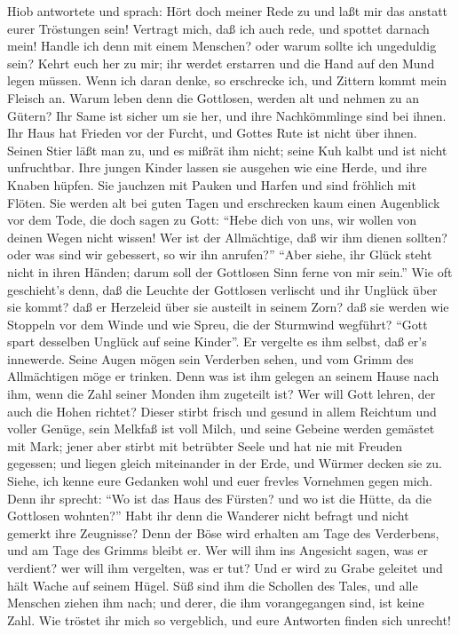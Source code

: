  Hiob antwortete und sprach:  Hört doch meiner
Rede zu und laßt mir das anstatt eurer Tröstungen sein! 
Vertragt mich, daß ich auch rede, und spottet darnach mein! 
Handle ich denn mit einem Menschen? oder warum sollte ich ungeduldig
sein?  Kehrt euch her zu mir; ihr werdet erstarren und die
Hand auf den Mund legen müssen.  Wenn ich daran denke, so
erschrecke ich, und Zittern kommt mein Fleisch an.  Warum
leben denn die Gottlosen, werden alt und nehmen zu an Gütern?
 Ihr Same ist sicher um sie her, und ihre Nachkömmlinge sind
bei ihnen.  Ihr Haus hat Frieden vor der Furcht, und Gottes
Rute ist nicht über ihnen.  Seinen Stier läßt man zu, und
es mißrät ihm nicht; seine Kuh kalbt und ist nicht unfruchtbar.
 Ihre jungen Kinder lassen sie ausgehen wie eine Herde, und
ihre Knaben hüpfen.  Sie jauchzen mit Pauken und Harfen und
sind fröhlich mit Flöten.  Sie werden alt bei guten Tagen
und erschrecken kaum einen Augenblick vor dem Tode,  die
doch sagen zu Gott: ``Hebe dich von uns, wir wollen von deinen Wegen
nicht wissen!  Wer ist der Allmächtige, daß wir ihm dienen
sollten? oder was sind wir gebessert, so wir ihn anrufen?''
 ``Aber siehe, ihr Glück steht nicht in ihren Händen; darum
soll der Gottlosen Sinn ferne von mir sein.''  Wie oft
geschieht's denn, daß die Leuchte der Gottlosen verlischt und ihr
Unglück über sie kommt? daß er Herzeleid über sie austeilt in seinem
Zorn?  daß sie werden wie Stoppeln vor dem Winde und wie
Spreu, die der Sturmwind wegführt?  ``Gott spart desselben
Unglück auf seine Kinder''. Er vergelte es ihm selbst, daß er's
innewerde.  Seine Augen mögen sein Verderben sehen, und vom
Grimm des Allmächtigen möge er trinken.  Denn was ist ihm
gelegen an seinem Hause nach ihm, wenn die Zahl seiner Monden ihm
zugeteilt ist?  Wer will Gott lehren, der auch die Hohen
richtet?  Dieser stirbt frisch und gesund in allem Reichtum
und voller Genüge,  sein Melkfaß ist voll Milch, und seine
Gebeine werden gemästet mit Mark;  jener aber stirbt mit
betrübter Seele und hat nie mit Freuden gegessen;  und
liegen gleich miteinander in der Erde, und Würmer decken sie zu.
 Siehe, ich kenne eure Gedanken wohl und euer frevles
Vornehmen gegen mich.  Denn ihr sprecht: ``Wo ist das Haus
des Fürsten? und wo ist die Hütte, da die Gottlosen wohnten?''
 Habt ihr denn die Wanderer nicht befragt und nicht gemerkt
ihre Zeugnisse?  Denn der Böse wird erhalten am Tage des
Verderbens, und am Tage des Grimms bleibt er.  Wer will ihm
ins Angesicht sagen, was er verdient? wer will ihm vergelten, was er
tut?  Und er wird zu Grabe geleitet und hält Wache auf
seinem Hügel.  Süß sind ihm die Schollen des Tales, und
alle Menschen ziehen ihm nach; und derer, die ihm vorangegangen sind,
ist keine Zahl.  Wie tröstet ihr mich so vergeblich, und
eure Antworten finden sich unrecht!

